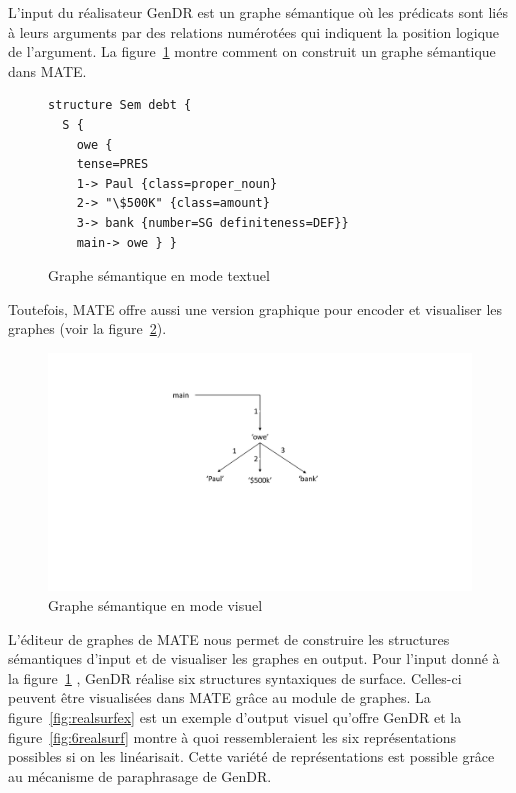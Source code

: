 L'input du réalisateur GenDR est un graphe sémantique \citep{mel2012semantics} où les prédicats sont liés à leurs arguments par des relations numérotées qui indiquent la position logique de l'argument. La figure~\ref{fig:debt} montre comment on construit un graphe sémantique dans MATE.

\begin{figure}
\begin{lstlisting}[language=mate]
structure Sem debt {
  S {
    owe {
    tense=PRES
    1-> Paul {class=proper_noun}
    2-> "\$500K" {class=amount}
    3-> bank {number=SG definiteness=DEF}}
    main-> owe } }
\end{lstlisting}
  \caption{Graphe sémantique en mode textuel}
	\label{fig:debt}
\end{figure}

Toutefois, MATE offre aussi une version graphique pour encoder et visualiser les graphes (voir la figure~\ref{fig:graphesem}).

\begin{figure}[htb]
	\centering
	\includegraphics[width=1\textwidth, trim = {0cm 8.3cm 0cm 3cm},clip]{ch3/figs/owe_sem.pdf}
	\caption{Graphe sémantique en mode visuel}
	\label{fig:graphesem}
\end{figure}

L'éditeur de graphes de MATE nous permet de construire les structures sémantiques d'input et de visualiser les graphes en output. Pour l'input donné à la figure~\ref{fig:debt} , GenDR réalise six structures syntaxiques de surface. Celles-ci peuvent être visualisées dans MATE grâce au module de graphes. La figure~\ref{fig:realsurfex} est un exemple d'output visuel qu'offre GenDR et la figure~\ref{fig:6realsurf} montre à quoi ressembleraient les six représentations possibles si on les linéarisait. Cette variété de représentations est possible grâce au mécanisme de paraphrasage de GenDR.

